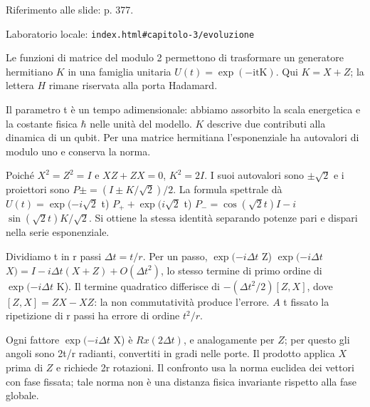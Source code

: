 {\sffamily\small\color{Ink!70} Riferimento alle slide: p. 377.\par}

{\sffamily\small\color{Ink!70} Laboratorio locale: \nolinkurl{index.html#capitolo-3/evoluzione}\par}

Le funzioni di matrice del modulo 2 permettono di trasformare un generatore hermitiano \(K\) in una famiglia unitaria \(U(t)=\allowbreak\exp (- \text{itK})\). Qui \(K=X+Z\); la lettera \(H\) rimane riservata alla porta Hadamard.\par

Il parametro t è un tempo adimensionale: abbiamo assorbito la scala energetica e la costante fisica \(\hbar \) nelle unità del modello. \(K\) descrive due contributi alla dinamica di un qubit. Per una matrice hermitiana l'esponenziale ha autovalori di modulo uno e conserva la norma.\par

Poiché \(X^{2}=Z^{2}=I\) e \(XZ+ZX=0\), \(K^{2}=2I\). I suoi autovalori sono \(\pm \sqrt{2}\) e i proiettori sono \(P\pm =(I\pm K/\sqrt{2})/2\). La formula spettrale dà \(U(t)=\allowbreak\exp (- i\sqrt{2}\) t) \(P_{+}+\allowbreak\exp (i\sqrt{2}\) t) \(P_{-}=\cos (\sqrt{2}t)I- i\) \(\sin (\sqrt{2}t)K/\sqrt{2}\). Si ottiene la stessa identità separando potenze pari e dispari nella serie esponenziale.\par

Dividiamo t in r passi \(\Delta t=t/r\). Per un passo, \(\allowbreak\exp (- i\Delta t\) Z) \(\allowbreak\exp (- i\Delta t\) \(X)=I- i\Delta t(X+Z)+O(\Delta t^{2})\), lo stesso termine di primo ordine di \(\allowbreak\exp (- i\Delta t\) K). Il termine quadratico differisce di \(- (\Delta t^{2}/2)[Z,\allowbreak X]\), dove \([Z,\allowbreak X]=ZX- XZ\): la non commutatività produce l'errore. \(A\) t fissato la ripetizione di r passi ha errore di ordine \(t^{2}/r\).\par

Ogni fattore \(\allowbreak\exp (- i\Delta t\) X) è \(Rx(2\Delta t)\), e analogamente per \(Z\); per questo gli angoli sono 2t/r radianti, convertiti in gradi nelle porte. Il prodotto applica \(X\) prima di \(Z\) e richiede 2r rotazioni. Il confronto usa la norma euclidea dei vettori con fase fissata; tale norma non è una distanza fisica invariante rispetto alla fase globale.\par



